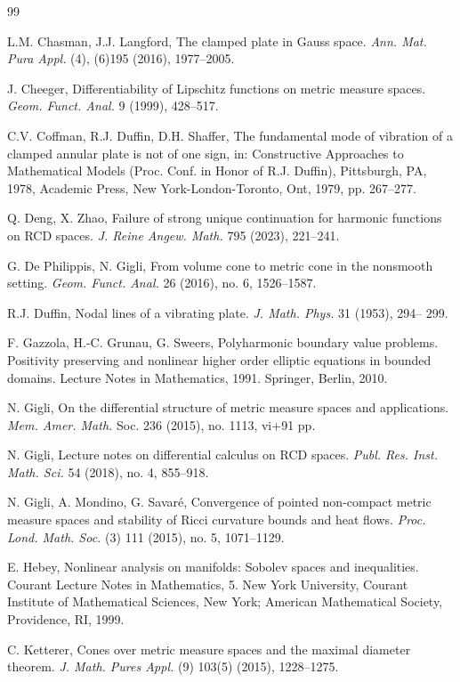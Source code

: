 \documentclass[11pt, reqno]{amsart}
\numberwithin{equation}{section}
\begin{document}
\begin{thebibliography}{99}
		
		 L.M. Chasman, J.J. Langford, The clamped plate in Gauss space.
		\textit{Ann. Mat. Pura Appl.} (4), (6)195 (2016), 1977--2005.
		
			J. Cheeger, Differentiability of Lipschitz functions on metric measure spaces. \textit{Geom. Funct. Anal.} 9 (1999),
		428--517.
		
		 	C.V. Coffman, R.J. Duffin, D.H. Shaffer, The fundamental mode of vibration of a clamped annular plate is not of one sign, in: Constructive Approaches to Mathematical Models (Proc. Conf. in Honor of R.J. Duffin), Pittsburgh, PA, 1978, Academic Press, New York-London-Toronto, Ont, 1979, pp. 267--277.
		
		 Q. Deng, X. Zhao,  
		Failure of strong unique continuation for harmonic functions on RCD spaces. 
	\textit{J. Reine Angew. Math.} 795 (2023), 221--241.
		
		 G. De Philippis, N. Gigli,  From volume cone to metric cone in the nonsmooth setting. \textit{Geom. Funct. Anal.} 26 (2016), no. 6, 1526--1587.
		
		 R.J. Duffin, Nodal lines of a vibrating plate. \textit{J. Math. Phys.} 31 (1953), 294--
		299. 

   F. Gazzola, H.-C. Grunau, G. Sweers, Polyharmonic boundary value
problems. Positivity preserving and nonlinear higher order elliptic equations
in bounded domains. Lecture Notes in Mathematics, 1991. Springer, Berlin, 
2010. 
		
		 N. Gigli, On the differential structure of metric measure spaces and applications. \textit{Mem. Amer. Math.} Soc. 236 (2015), no. 1113, vi+91 pp.
		
		 N. Gigli, Lecture notes on differential calculus on RCD spaces. \textit{Publ. Res. Inst. Math. Sci.} 54 (2018), no. 4, 855--918.
		
		 N. Gigli, A. Mondino, G. Savaré, Convergence of pointed non-compact metric measure spaces and stability of Ricci curvature bounds and heat flows. \textit{Proc. Lond. Math. Soc.} (3) 111 (2015), no. 5, 1071--1129. 
		
		 E. Hebey, Nonlinear analysis on manifolds: Sobolev spaces and inequalities. Courant Lecture Notes in Mathematics, 5.
		New York University, Courant Institute of Mathematical Sciences, New
		York; American Mathematical Society, Providence, RI, 1999.
		
		
		 C. Ketterer,  Cones over metric measure spaces and the maximal diameter theorem. \textit{J. Math. Pures
		Appl.} (9) 103(5) (2015), 1228--1275. 
		

\end{thebibliography}
\end{document}
